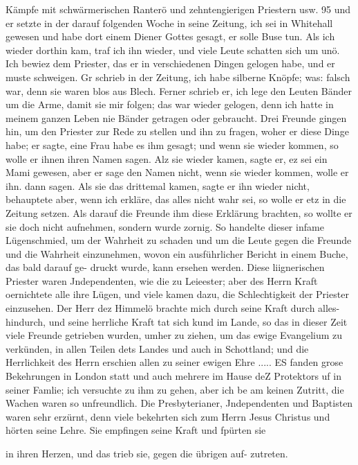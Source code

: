 Kämpfe mit schwärmerischen Ranterö und zehntengierigen Priestern usw. 95
und er setzte in der darauf folgenden Woche in seine Zeitung,
ich sei in Whitehall gewesen und habe dort einem Diener Gottes
gesagt, er solle Buse tun. Als ich wieder dorthin kam, traf ich
ihn wieder, und viele Leute schatten sich um unö. Ich bewiez
dem Priester, das er in verschiedenen Dingen gelogen habe, und
er muste schweigen. Gr schrieb in der Zeitung, ich habe silberne
Knöpfe; was: falsch war, denn sie waren blos aus Blech. Ferner
schrieb er, ich lege den Leuten Bänder um die Arme, damit sie
mir folgen; das war wieder gelogen, denn ich hatte in meinem
ganzen Leben nie Bänder getragen oder gebraucht. Drei Freunde
gingen hin, um den Priester zur Rede zu stellen und ihn zu
fragen, woher er diese Dinge habe; er sagte, eine Frau habe es
ihm gesagt; und wenn sie wieder kommen, so wolle er ihnen ihren
Namen sagen. Alz sie wieder kamen, sagte er, ez sei ein Mami
gewesen, aber er sage den Namen nicht, wenn sie wieder kommen,
wolle er ihn. dann sagen. Als sie das drittemal kamen, sagte
er ihn wieder nicht, behauptete aber, wenn ich erkläre, das alles
nicht wahr sei, so wolle er etz in die Zeitung setzen. Als darauf
die Freunde ihm diese Erklärung brachten, so wollte er sie doch
nicht aufnehmen, sondern wurde zornig. So handelte dieser
infame Lügenschmied, um der Wahrheit zu schaden und um die
Leute gegen die Freunde und die Wahrheit einzunehmen, wovon
ein ausführlicher Bericht in einem Buche, das bald darauf ge-
druckt wurde, kann ersehen werden. Diese liignerischen Priester
waren Jndependenten, wie die zu Leieester; aber des Herrn
Kraft oernichtete alle ihre Lügen, und viele kamen dazu, die
Schlechtigkeit der Priester einzusehen. Der Herr dez Himmelö
brachte mich durch seine Kraft durch alles- hindurch, und seine
herrliche Kraft tat sich kund im Lande, so das in dieser Zeit
viele Freunde getrieben wurden, umher zu ziehen, um das ewige
Evangelium zu verkünden, in allen Teilen dets Landes und auch
in Schottland; und die Herrlichkeit des Herrn erschien allen zu
seiner ewigen Ehre ..... ES fanden grose Bekehrungen in
London statt und auch mehrere im Hause deZ Protektors uf in
seiner Famlie; ich versuchte zu ihm zu gehen, aber ich be am
keinen Zutritt, die Wachen waren so unfreundlich.
Die Presbyterianer, Jndependenten und Baptisten waren sehr
erzürnt, denn viele bekehrten sich zum Herrn Jesus Christus und
hörten seine Lehre. Sie empfingen seine Kraft und fpürten sie


in ihren Herzen, und das trieb sie, gegen die übrigen auf-
zutreten.
